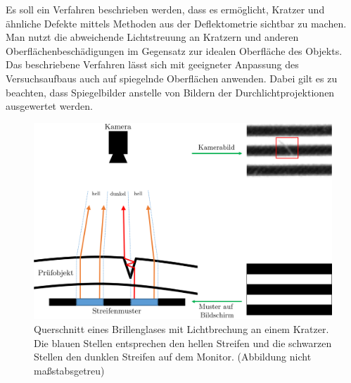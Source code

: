 Es soll ein Verfahren beschrieben werden, dass es ermöglicht, Kratzer und ähnliche Defekte mittels Methoden aus der Deflektometrie sichtbar zu machen.
Man nutzt die abweichende Lichtstreuung an Kratzern und anderen Oberflächenbeschädigungen im Gegensatz zur idealen Oberfläche des Objekts.
Das beschriebene Verfahren lässt sich mit geeigneter Anpassung des Versuchsaufbaus auch auf spiegelnde Oberflächen anwenden.
Dabei gilt es zu beachten, dass Spiegelbilder anstelle von Bildern der Durchlichtprojektionen ausgewertet werden.

\begin{figure}[H]
	\centering
	\includegraphics[width=\textwidth]{03_sichtpruefungDurchLichtstreuung/verfahren/figures/scratch_reflection_with_images}
	\caption[Lichtbrechung an einem Kratzer]{Querschnitt eines Brillenglases mit Lichtbrechung an einem Kratzer. Die blauen Stellen entsprechen den hellen Streifen und die schwarzen Stellen den dunklen Streifen auf dem Monitor. (Abbildung nicht maßstabsgetreu)}
	\label{img:lightreflection}
\end{figure}

